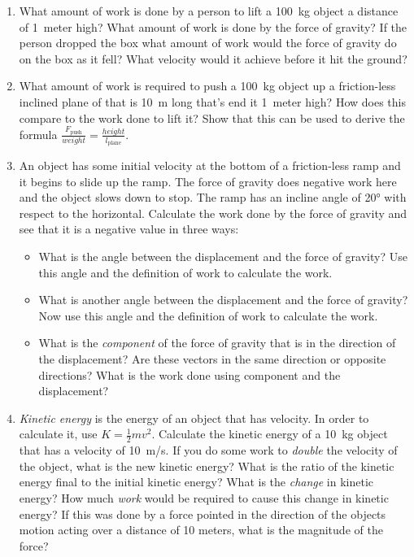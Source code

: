 \begin{enumerate}
\item
What amount of work is done by a person to lift a \SI{100}{kg} object a distance of \SI{1}{meter} high? What amount of work is done by the force of gravity? If the person dropped the box what amount of work would the force of gravity do on the box as it fell? What velocity would it achieve before it hit the ground?

\item What amount of work is required to push a \SI{100}{kg} object up a friction-less inclined plane of that is \SI{10}{\meter} long that's end it \SI{1}{meter} high? How does this compare to the work done to lift it? Show that this can be used to derive the formula $\frac{F_{\mathrm{push}}}{\mathit{weight}}=\frac{\mathit{height}}{l_{\mathrm{plane}}}$.\bigskip

\item An object has some initial velocity at the bottom of a friction-less ramp and it begins to slide up the ramp. The force of gravity does negative work here and the object slows down to stop. The ramp has an incline angle of \ang{20} with respect to the horizontal. Calculate the work done by the force of gravity and see that it is a negative value in three ways:
\begin{itemize}
	\setlength\itemsep{1 in}
	\item What is the angle between the displacement and the force of gravity? Use this angle and the definition of work to calculate the work.
	\item What is another angle between the displacement and the force of gravity? Now use this angle and the definition of work to calculate the work.
	\item What is the \emph{component} of the force of gravity that is in the direction of the displacement? Are these vectors in the same direction or opposite directions? What is the work done using component and the displacement? 
\end{itemize}

\item 
\emph{Kinetic energy} is the energy of an object that has velocity. In order to calculate it, use $K = \frac{1}{2}mv^2$. Calculate the kinetic energy of a \SI{10}{kg} object that has a velocity of \SI{10}{m/s}. If you do some work to \emph{double} the velocity of the object, what is the new kinetic energy? What is the ratio of the kinetic energy final to the initial kinetic energy? What is the \emph{change} in kinetic energy? How much \emph{work} would be required to cause this change in kinetic energy? If this was done by a force pointed in the direction of the objects motion acting over a distance of 10 meters, what is the magnitude of the force?\hugeskip


\end{enumerate}
